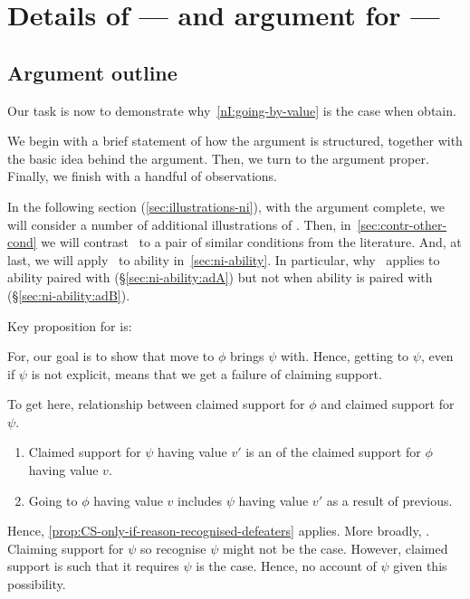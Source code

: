 \newpage

\section{Details of --- and argument for --- \nI{}}
\label{sec:details-ni}
\label{sec:re-do-ni}

\subsection*{Argument outline}

\begin{note}
  Our task is now to demonstrate why~\ref{nI:going-by-value} is the case when \nIBackground{} obtain.

  We begin with a brief statement of how the argument is structured, together with the basic idea behind the argument.
  Then, we turn to the argument proper.
  Finally, we finish with a handful of observations.

  In the following section (\ref{sec:illustrations-ni}), with the argument complete, we will consider a number of additional illustrations of \nI{}.
  Then, in~\ref{sec:contr-other-cond} we will contrast~\nI{} to a pair of similar conditions from the literature.
  And, at last, we will apply~\nI{} to ability in~\autoref{sec:ni-ability}.
  In particular, why~\nI{} applies to ability paired with \adA{} (\S\ref{sec:ni-ability:adA}) but not when ability is paired with \adB{} (\S\ref{sec:ni-ability:adB}).
\end{note}

\begin{note}
  Key proposition for \nI{} is:

  \begin{quote}
    \vspace{-\baselineskip}
    \propRecogniseDefeaters*
  \end{quote}

  For, our goal is to show that move to \(\phi\) brings \(\psi\) with.
  Hence, getting to \(\psi\), even if \(\psi\) is not explicit, means that we get a failure of claiming support.

  To get here, relationship between claimed support for \(\phi\) and claimed support for \(\psi\).

  \begin{enumerate}
  \item Claimed support for \(\psi\) having value \(v'\) is an \requ{} of the claimed support for \(\phi\) having value \(v\).
  \item Going to \(\phi\) having value \(v\) includes \(\psi\) having value \(v'\) as a result of previous.
  \end{enumerate}
  Hence, \autoref{prop:CS-only-if-reason-recognised-defeaters} applies.
  More broadly, \eiS{}.
  Claiming support for \(\psi\) so recognise \(\psi\) might not be the case.
  However, claimed support is such that it requires \(\psi\) is the case.
  Hence, no account of \(\psi\) given this possibility.
\end{note}

